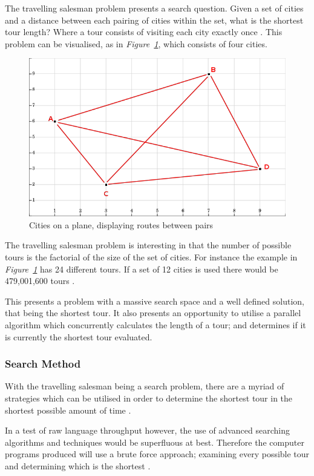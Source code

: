 \documentclass[12pt,a4paper]{article}
\begin{document}
The travelling salesman problem presents a search question. Given a set of cities and a distance between each pairing of cities within the set, what is the shortest tour length? Where a tour consists of visiting each city exactly once \cite{tsp}. This problem can be visualised, as in \textit{Figure~\ref{fig:tsp1}}, which consists of four cities.
\begin{figure}[h]
  \centering
  \includegraphics[scale=.50]{tsp2}
  \caption{Cities on a plane, displaying routes between pairs}
  \label{fig:tsp1}
\end{figure}

The travelling salesman problem is interesting in that the number of possible tours is the factorial of the size of the set of cities. For instance the example in \textit{Figure~\ref{fig:tsp1}} has 24 different tours. If a set of 12 cities is used there would be 479,001,600 tours \cite{tsp}.

This presents a problem with a massive search space and a well defined solution, that being the shortest tour. It also presents an opportunity to utilise a parallel algorithm which concurrently calculates the length of a tour; and determines if it is currently the shortest tour evaluated.

\subsubsection{Search Method}

With the travelling salesman being a search problem, there are a myriad of strategies which can be utilised in order to determine the shortest tour in the shortest possible amount of time \cite{tsp}.

In a test of raw language throughput however, the use of advanced searching algorithms and techniques would be superfluous at best. Therefore the computer programs produced will use a brute force approach; examining every possible tour and determining which is the shortest \cite{bruteForce}.
\end{document}

